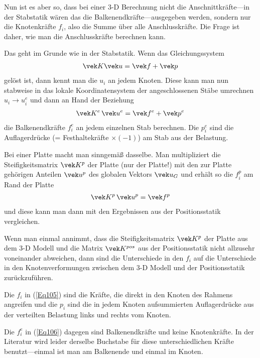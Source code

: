 {{{{{{{Nun ist es aber so, dass bei einer 3-D Berechnung nicht die Anschnittkr\"{a}fte---in der Stabstatik w\"{a}ren das die Balkenendkr\"{a}fte---ausgegeben werden, sondern nur die Knotenkr\"{a}fte $f_i$, also die Summe \"{u}ber alle Anschlusskr\"{a}fte. Die Frage ist daher, wie man die  Anschlusskr\"{a}fte berechnen kann.

Das geht im Grunde wie in der Stabstatik. Wenn das Gleichungssystem
\begin{align} \label{Eq105}
\vek K\vek u = \vek f + \vek p
\end{align}
gel\"{o}st ist, dann kennt man die $u_i$ an jedem Knoten. Diese kann man nun stabweise in das lokale Koordinatensystem der angeschlossenen St\"{a}be umrechnen $u_i \to u_i^e$ und dann an Hand der Beziehung
\begin{align}\label{Eq106}
\vek K^e\,\vek u^e = \vek f^e + \vek p^e
\end{align}
die Balkenendkr\"{a}fte $f_i^e$ an jedem einzelnen Stab berechnen. Die $p_i^e$ sind die Auflagerdr\"{u}cke (= Festhaltekr\"{a}fte $\times (-1)$) am Stab aus der Belastung.

Bei einer Platte macht man sinngem\"{a}{\ss} dasselbe. Man multipliziert die Steifigkeitsmatrix $\vek K^p$ der Platte (nur der Platte!) mit den zur Platte geh\"{o}rigen Anteilen $\vek u^p$ des globalen Vektors $\vek u_G$ und erh\"{a}lt so die $f_i^p$ am Rand der Platte
\begin{align}
\vek K^p\,\vek u^p = \vek f^p
\end{align}
und diese kann man dann mit den Ergebnissen aus der Positionsstatik vergleichen.

Wenn man einmal annimmt, dass die Steifigkeitsmatrix $\vek K^p$ der Platte aus dem 3-D Modell und die Matrix $\vek K^{pos}$ aus der Positionsstatik nicht allzusehr voneinander abweichen, dann sind die Unterschiede in den $f_i$ auf die Unterschiede in den Knotenverformungen zwischen dem 3-D Modell und der Positionsstatik zur\"{u}ckzuf\"{u}hren.\\

\begin{remark}
Die $f_i$ in (\ref{Eq105}) sind die Kr\"{a}fte, die direkt in den Knoten des Rahmens angreifen und die $p_i$ sind die in jedem Knoten aufsummierten Auflagerdr\"{u}cke aus der verteilten Belastung links und rechts vom Knoten.

Die $f_i^e$ in (\ref{Eq106}) dagegen sind Balkenendkr\"{a}fte und keine Knotenkr\"{a}fte. In der Literatur wird leider derselbe Buchstabe f\"{u}r diese unterschiedlichen Kr\"{a}fte benutzt---einmal ist man am Balkenende und einmal im Knoten.
\end{remark}

}}}}}}}
